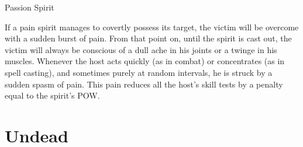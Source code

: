 \begin{samepage}
\begin{monsterbox}{Passion Spirit}
\begin{rpg-monsteraction}
	\end{rpg-monsteraction}
	\begin{rpg-monsteraction}
		If a pain spirit manages to covertly possess its target, the victim will be overcome with a sudden burst of pain. From that point on, until the spirit is cast out, the victim will always be conscious of a dull ache in his joints or a twinge in his muscles. Whenever the host acts quickly (as in combat) or concentrates (as in spell casting), and sometimes purely at random intervals, he is struck by a sudden spasm of pain. This pain reduces all the host’s skill tests by a penalty equal to the spirit’s POW.
	\end{rpg-monsteraction}
\end{monsterbox}
\end{samepage}

\clearpage

\section{Undead}
\label{sec:undead}


